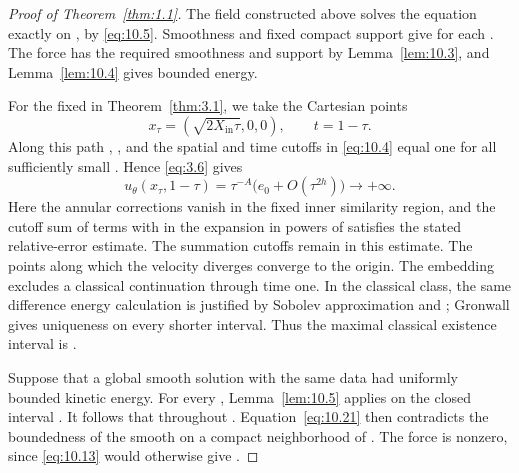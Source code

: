 %
\begin{proof}[Proof of Theorem~\ref{thm:1.1}]
The field constructed above solves the equation exactly on
\NSi{NS-F-P124-001}{[0,1)}, by \eqref{eq:10.5}. Smoothness and fixed compact support
give  for each
. The force has the required smoothness and support by
Lemma~\ref{lem:10.3}, and Lemma~\ref{lem:10.4} gives bounded energy.

For the fixed  in Theorem~\ref{thm:3.1}, we take
the Cartesian points
\begin{equation}
  x_\tau=(\sqrt{2X_{\mathrm{in}}\tau},0,0),\qquad t=1-\tau.
\tag{10.20}\label{eq:10.20}
\end{equation}
Along this path , , and the
spatial and time cutoffs in \eqref{eq:10.4} equal one for all sufficiently small
. Hence \eqref{eq:3.6} gives
\begin{equation}
  u_\theta(x_\tau,1-\tau)
  =\tau^{-A}\bigl(e_0+O(\tau^{2h})\bigr)\longrightarrow+\infty.
\tag{10.21}\label{eq:10.21}
\end{equation}
Here the annular corrections vanish in the fixed inner similarity region, and the cutoff sum
of terms with  in the expansion in powers of
 satisfies the stated relative-error estimate. The summation
cutoffs remain in this estimate. The points  along which the
velocity diverges converge to the origin. The embedding
 excludes a classical
 continuation through time one. In the classical
 class, the same difference energy calculation is justified by
Sobolev approximation and ;
Gronwall gives uniqueness on every shorter interval. Thus the maximal classical existence
interval is \NSi{NS-F-P124-017}{[0,1)}.

Suppose that a global smooth solution  with the same data had
uniformly bounded kinetic energy. For every ,
Lemma~\ref{lem:10.5} applies on the closed interval . It
follows that  throughout \NSi{NS-F-P124-022}{[0,1)}.
Equation~\eqref{eq:10.21} then contradicts the boundedness of the smooth
 on a compact neighborhood of .
The force is nonzero, since \eqref{eq:10.13} would otherwise give
.


\end{proof}
